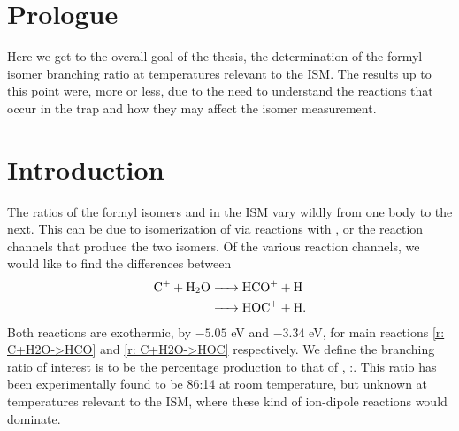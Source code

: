 \section{Prologue}

Here we get to the overall goal of the thesis, the determination of the formyl isomer branching ratio at temperatures relevant to the ISM. The results up to this point were, more or less, due to the need to understand the reactions that occur in the trap and how they may affect the isomer measurement. 

\section{Introduction}

The ratios of the formyl isomers  and  in the ISM vary wildly from one body to the next.\cite{Liszt2004} This can be due to isomerization of  via reactions with , or the reaction channels that produce the two isomers.\cite{Apponi1997} Of the various reaction channels, we would like to find the differences between
\begin{align}
	\ce{C+ + H2O & -> HCO+ + H} \label{r: C+H2O->HCO} \\
	\ce{& -> HOC+ + H}. \label{r: C+H2O->HOC}
\end{align}
Both reactions are exothermic, by $-5.05$ eV and $-3.34$ eV, for main reactions \ref{r: C+H2O->HCO} and \ref{r: C+H2O->HOC} respectively.\cite{Chalk1997} We define the branching ratio of interest is to be the percentage  production to that of , :. This ratio has been experimentally found to be 86:14 at room temperature\cite{Freeman1987}, but unknown at temperatures relevant to the ISM, where these kind of ion-dipole reactions would dominate.

